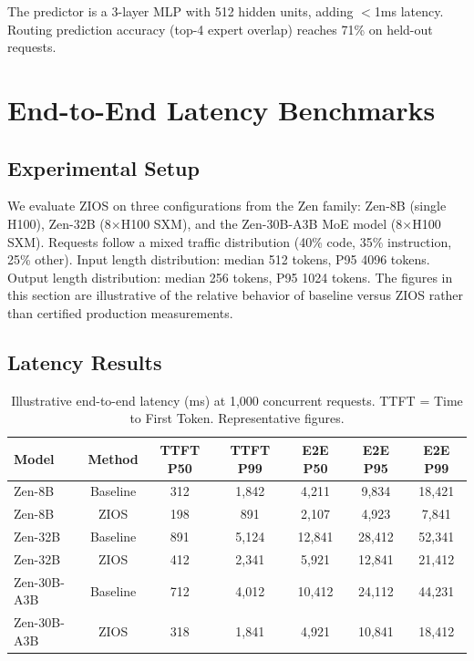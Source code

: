 \documentclass[11pt,a4paper]{article}
\begin{document}
The predictor is a 3-layer MLP with 512 hidden units, adding $<$1ms latency. Routing prediction accuracy (top-4 expert overlap) reaches 71\% on held-out requests.

\section{End-to-End Latency Benchmarks}

\subsection{Experimental Setup}

We evaluate ZIOS on three configurations from the Zen family: Zen-8B (single H100), Zen-32B (8$\times$H100 SXM), and the Zen-30B-A3B MoE model (8$\times$H100 SXM). Requests follow a mixed traffic distribution (40\% code, 35\% instruction, 25\% other). Input length distribution: median 512 tokens, P95 4096 tokens. Output length distribution: median 256 tokens, P95 1024 tokens. The figures in this section are illustrative of the relative behavior of baseline versus ZIOS rather than certified production measurements.

\subsection{Latency Results}

\begin{table}[H]
\centering
\caption{Illustrative end-to-end latency (ms) at 1,000 concurrent requests. TTFT = Time to First Token. Representative figures.}
\label{tab:latency_1k}
\begin{tabular}{lcccccc}
\toprule
Model & Method & TTFT P50 & TTFT P99 & E2E P50 & E2E P95 & E2E P99 \\
\midrule
Zen-8B & Baseline & 312 & 1,842 & 4,211 & 9,834 & 18,421 \\
Zen-8B & ZIOS & 198 & 891 & 2,107 & 4,923 & 7,841 \\
\midrule
Zen-32B & Baseline & 891 & 5,124 & 12,841 & 28,412 & 52,341 \\
Zen-32B & ZIOS & 412 & 2,341 & 5,921 & 12,841 & 21,412 \\
\midrule
Zen-30B-A3B & Baseline & 712 & 4,012 & 10,412 & 24,112 & 44,231 \\
Zen-30B-A3B & ZIOS & 318 & 1,841 & 4,921 & 10,841 & 18,412 \\
\bottomrule
\end{tabular}
\end{table}
\end{document}
